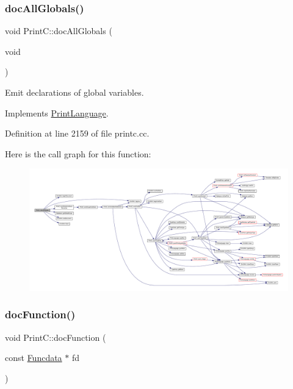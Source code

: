 \subsubsection{\texorpdfstring{docAllGlobals()}{docAllGlobals()}}
{\footnotesize\ttfamily void Print\+C\+::doc\+All\+Globals (\begin{DoxyParamCaption}\item[{void}]{ }\end{DoxyParamCaption})\hspace{0.3cm}{\ttfamily [virtual]}}



Emit declarations of global variables. 



Implements \mbox{\hyperlink{class_print_language_a3fbbabf7a0a2f67e02b49d895db04fa9}{Print\+Language}}.



Definition at line 2159 of file printc.\+cc.

Here is the call graph for this function\+:
\nopagebreak
\begin{figure}[H]
\begin{center}
\leavevmode
\includegraphics[width=350pt]{class_print_c_a3ba75e33a923a30e5fe29b8201855749_cgraph}
\end{center}
\end{figure}
\mbox{\label{class_print_c_a7a3890c28908f1229f8e94e0239fe0ea}} 
\subsubsection{\texorpdfstring{docFunction()}{docFunction()}}
{\footnotesize\ttfamily void Print\+C\+::doc\+Function (\begin{DoxyParamCaption}\item[{const \mbox{\hyperlink{class_funcdata}{Funcdata}} $\ast$}]{fd }\end{DoxyParamCaption})\hspace{0.3cm}{\ttfamily [virtual]}}



